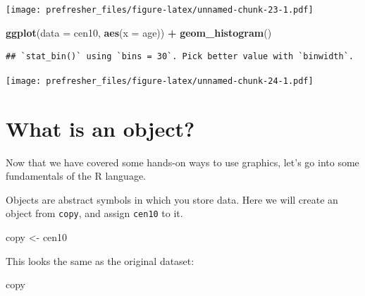 \documentclass[]{book}
\newenvironment{Shaded}{\begin{snugshade}}{\end{snugshade}}
\newcommand{\KeywordTok}[1]{\textcolor[rgb]{0.13,0.29,0.53}{\textbf{#1}}}
\newcommand{\DataTypeTok}[1]{\textcolor[rgb]{0.13,0.29,0.53}{#1}}
\newcommand{\StringTok}[1]{\textcolor[rgb]{0.31,0.60,0.02}{#1}}
\newcommand{\OperatorTok}[1]{\textcolor[rgb]{0.81,0.36,0.00}{\textbf{#1}}}
\newcommand{\NormalTok}[1]{#1}
\theoremstyle{definition}
\theoremstyle{definition}
\theoremstyle{definition}
\theoremstyle{remark}
\begin{document}
\begin{Shaded}
\end{Shaded}

\texttt{[image: prefresher\_files/figure-latex/unnamed-chunk-23-1.pdf]}

\begin{Shaded}
\begin{Highlighting}[]
\KeywordTok{ggplot}\NormalTok{(}\DataTypeTok{data =}\NormalTok{ cen10, }\KeywordTok{aes}\NormalTok{(}\DataTypeTok{x =}\NormalTok{ age)) }\OperatorTok{+}
\StringTok{  }\KeywordTok{geom_histogram}\NormalTok{()}
\end{Highlighting}
\end{Shaded}

\begin{verbatim}
## `stat_bin()` using `bins = 30`. Pick better value with `binwidth`.
\end{verbatim}

\texttt{[image: prefresher\_files/figure-latex/unnamed-chunk-24-1.pdf]}

\section{What is an object?}\label{what-is-an-object}

Now that we have covered some hands-on ways to use graphics, let's go
into some fundamentals of the R language.

Objects are abstract symbols in which you store data. Here we will
create an object from \texttt{copy}, and assign \texttt{cen10} to it.

\begin{Shaded}
\begin{Highlighting}[]
\NormalTok{copy <-}\StringTok{ }\NormalTok{cen10 }
\end{Highlighting}
\end{Shaded}

This looks the same as the original dataset:

\begin{Shaded}
\begin{Highlighting}[]
\NormalTok{copy}
\end{Highlighting}
\end{Shaded}
\end{document}
